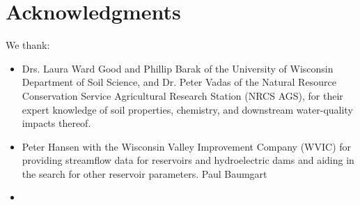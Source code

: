 \section{Acknowledgments}
We thank:
\begin{itemize}
	\item Drs. Laura Ward Good and Phillip Barak of the University of Wisconsin Department of Soil Science, and Dr. Peter Vadas of the Natural Resource Conservation Service Agricultural Research Station (NRCS AGS), for their expert knowledge of soil properties, chemistry, and downstream water-quality impacts thereof.
	\item Peter Hansen with the Wisconsin Valley Improvement Company (WVIC) for providing streamflow data for reservoirs and hydroelectric dams and aiding in the search for other reservoir parameters.
	\iten Paul Baumgart
	\item 
\end{itemize}
\pagebreak